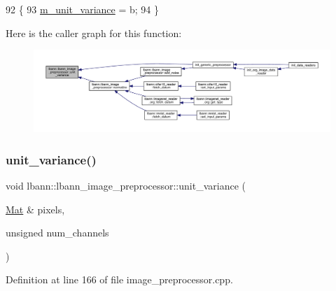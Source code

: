 \begin{DoxyCode}
92                              \{
93     \hyperlink{classlbann_1_1lbann__image__preprocessor_ae365a9e20f060b44de7835aceceb491c}{m\_unit\_variance} = b;
94   \}
\end{DoxyCode}
Here is the caller graph for this function\+:\nopagebreak
\begin{figure}[H]
\begin{center}
\leavevmode
\includegraphics[width=350pt]{classlbann_1_1lbann__image__preprocessor_a05c4cb5cb842df5d46eebe15c6ea9de3_icgraph}
\end{center}
\end{figure}
\mbox{\label{classlbann_1_1lbann__image__preprocessor_af9fcb483843230008a53d60c12975f61}} 
\subsubsection{\texorpdfstring{unit\+\_\+variance()}{unit\_variance()}\hspace{0.1cm}{\footnotesize\ttfamily [2/2]}}
{\footnotesize\ttfamily void lbann\+::lbann\+\_\+image\+\_\+preprocessor\+::unit\+\_\+variance (\begin{DoxyParamCaption}\item[{\hyperlink{base_8hpp_a68f11fdc31b62516cb310831bbe54d73}{Mat} \&}]{pixels,  }\item[{unsigned}]{num\+\_\+channels }\end{DoxyParamCaption})\hspace{0.3cm}{\ttfamily [protected]}}



Definition at line 166 of file image\+\_\+preprocessor.\+cpp.


